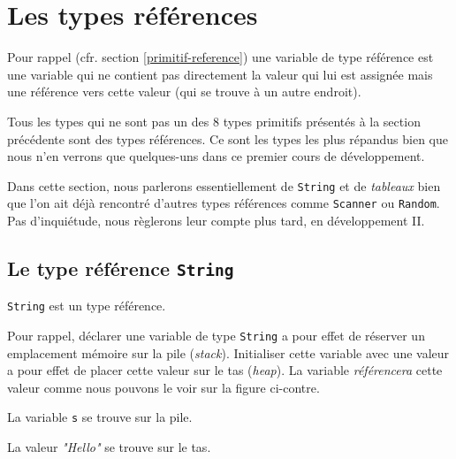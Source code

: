 \section{Les types références}

Pour rappel (cfr. section \vref{primitif-reference}) une variable de type
référence est une variable qui ne contient pas directement la valeur qui lui
est assignée mais une référence vers cette valeur (qui se trouve à un autre
endroit).  

Tous les types qui ne sont pas un des 8 types primitifs présentés à la section
précédente sont des types références. Ce sont les types les plus répandus bien
que nous n'en verrons que quelques-uns dans ce premier cours de développement. 

Dans cette section, nous parlerons essentiellement de \texttt{String} et de
\textit{tableaux} bien que l'on ait déjà rencontré d'autres types références
comme \texttt{Scanner} ou \texttt{Random}. Pas d'inquiétude, nous règlerons
leur compte plus tard, en développement II. 

\clearpage
\subsection{Le type référence \texttt{String}}

\texttt{String} est un type référence. 

\begin{figure}
	\begin{center}
	\end{center}
\end{figure}

Pour rappel, déclarer une variable de type \texttt{String} a pour effet de
réserver un emplacement mémoire sur la pile (\textit{stack}). Initialiser cette
variable avec une valeur a pour effet de placer cette valeur sur le tas
(\textit{heap}). La variable \textit{référencera} cette valeur comme nous
pouvons le voir sur la figure ci-contre. 

La variable \texttt{s} se trouve sur la pile. 

La valeur \textit{"Hello"} se trouve sur le tas. 

